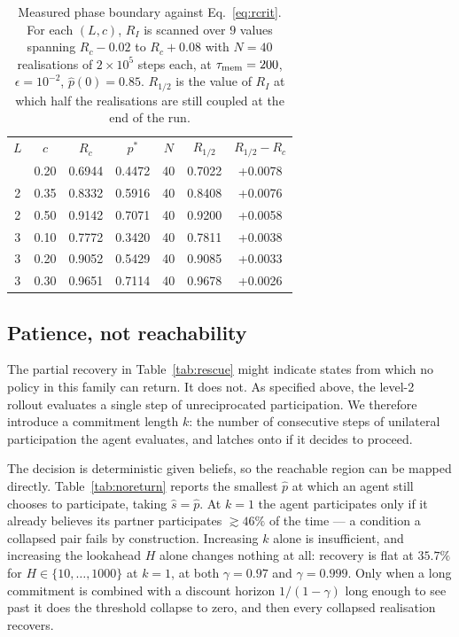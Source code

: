 \documentclass[aps,pre,twocolumn,superscriptaddress,floatfix,longbibliography]{revtex4-2}
\begin{document}
\begin{table}[t]
\caption{Measured phase boundary against Eq.~\eqref{eq:rcrit}. For each
$(L,c)$, $R_I$ is scanned over $9$ values spanning $R_c-0.02$ to $R_c+0.08$
with $N=40$ realisations of $2\times10^{5}$ steps each, at
$\tau_{\rm mem}=200$, $\epsilon=10^{-2}$, $\hat p(0)=0.85$. $R_{1/2}$ is the
value of $R_I$ at which half the realisations are still coupled at the end of the
run.}
\label{tab:boundary}
\begin{ruledtabular}
\begin{tabular}{ccccccc}
$L$ & $c$ & $R_c$ & $p^{*}$ & $N$ & $R_{1/2}$ & $R_{1/2}-R_c$ \\
\colrule
2 & 0.20 & 0.6944 & 0.4472 & 40 & 0.7022 & +0.0078 \\
2 & 0.35 & 0.8332 & 0.5916 & 40 & 0.8408 & +0.0076 \\
2 & 0.50 & 0.9142 & 0.7071 & 40 & 0.9200 & +0.0058 \\
3 & 0.10 & 0.7772 & 0.3420 & 40 & 0.7811 & +0.0038 \\
3 & 0.20 & 0.9052 & 0.5429 & 40 & 0.9085 & +0.0033 \\
3 & 0.30 & 0.9651 & 0.7114 & 40 & 0.9678 & +0.0026 \\
\end{tabular}
\end{ruledtabular}
\end{table}

\subsection{Patience, not reachability}

The partial recovery in Table~\ref{tab:rescue} might indicate states from which
no policy in this family can return. It does not. As specified above, the
level-2 rollout evaluates a single step of unreciprocated participation. We
therefore introduce a commitment length $k$: the number of consecutive steps of
unilateral participation the agent evaluates, and latches onto if it decides to
proceed.

The decision is deterministic given beliefs, so the reachable region can be
mapped directly. Table~\ref{tab:noreturn} reports the smallest $\hat p$ at which
an agent still chooses to participate, taking $\hat s=\hat p$. At $k=1$ the
agent participates only if it already believes its partner participates
$\gtrsim 46\%$ of the time --- a condition a collapsed pair fails by
construction. Increasing $k$ alone is insufficient, and increasing the lookahead
$H$ alone changes nothing at all: recovery is flat at $35.7\%$ for
$H\in\{10,\ldots,1000\}$ at $k=1$, at both $\gamma=0.97$ and
$\gamma=0.999$. Only when a long commitment is combined with
a discount horizon $1/(1-\gamma)$ long enough to see past it does the threshold
collapse to zero, and then every collapsed realisation recovers.
\end{document}
